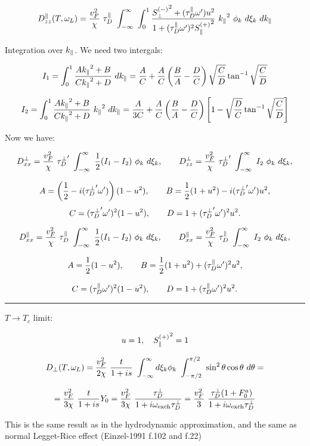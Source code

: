 \documentclass[a4paper]{article}
\begin{document}
$$
D^\parallel_{zz}(T, \ol) =
  \frac{v_F^2}{\chi}\ \t
  \ \int_{-\infty}^{\infty}\ \int_{0}^{1}
  \frac{\sm + (\t\op)u^2 }{1+(\t\op)^2\sp}
  \  \kpa^2\ \phi_k\ d\xi_k\ d\kpa
$$

\eject
Integration over $\kpa$. We need two intergals:

$$
I_1 = \int_0^1 \frac{A\kpa^2 + B}{C \kpa^2 + D}\ d\kpa = 
\frac{A}{C} + \frac{A}{C}\left(\frac{B}{A} - \frac{D}{C}\right)
\sqrt{\frac{C}{D}}\tan^{-1}\sqrt{\frac{C}{D}}
$$

$$
I_2 = \int_0^1 \frac{A\kpa^2 + B}{C \kpa^2 + D}\ \kpa^2\ d\kpa =
\frac{A}{3C} + \frac{A}{C}\left(\frac{B}{A} - \frac{D}{C}\right)
\left[ 1 - \sqrt{\frac{D}{C}}\tan^{-1}\sqrt{\frac{C}{D}} \right]
$$

Now we have:

$$
D^\perp_{xx} =
  \frac{v_F^2}{\chi}\ \tp
  \ \int_{-\infty}^{\infty}
  \ \frac12 (I_1-I_2)\ \phi_k\ d\xi_k,
\qquad
D^\perp_{zz} =
  \frac{v_F^2}{\chi}\ \tp
  \ \int_{-\infty}^{\infty}
  \ I_2\ \phi_k\ d\xi_k,
$$

$$
A = \left(\frac12 - i(\tp\op)\right) (1-u^2), \qquad
B = \frac12 (1+u^2) - i(\tp\op) u^2,
$$
$$
C = (\tp\op)^2 (1-u^2),\qquad
D = 1 + (\tp\op)^2 u^2.
$$

$$
D^\parallel_{xx} =
  \frac{v_F^2}{\chi}\ \t
  \ \int_{-\infty}^{\infty}
  \ \frac12 (I_1-I_2)\ \phi_k\ d\xi_k,
\qquad
D^\parallel_{xx} =
  \frac{v_F^2}{\chi}\ \t
  \ \int_{-\infty}^{\infty}
  \ I_2\ \phi_k\ d\xi_k,
$$

$$
A = \frac12 (1-u^2), \qquad
B = \frac12 (1+u^2) + (\t\op)^2 u^2,
$$

$$
C = (\t\op)^2 (1-u^2),\qquad
D = 1 + (\t\op)^2 u^2.
$$

\hrule\medskip

$T\rightarrow T_c$ limit:

$$
u=1,\quad
{\sp} = 1
$$

$$
D_\perp (T, \ol) =
  \frac{v_F^2}{2\chi}
  \ \frac{t}{1+is}
  \ \int_{-\infty}^{\infty}
  d\xi_k\phi_k
  \ \int_{-\pi/2}^{\pi/2}
  \  \sin^2\theta \cos\theta \ d\theta =
$$

$$
  = \frac{v_F^2}{3\chi} \ \frac{t}{1+is} Y_0
  = \frac{v_F^2}{3\chi} \ \frac{\tdp}{1+i\oe\tdp}
  = \frac{v_F^2}{3}\ \frac{\tdp (1+F_0^a)}{1+i\oe\tdp}
$$

This is the same result as in the hydrodynamic approximation,
and the same as normal Legget-Rice effect (Einzel-1991 f.102 and f.22)
\end{document}
